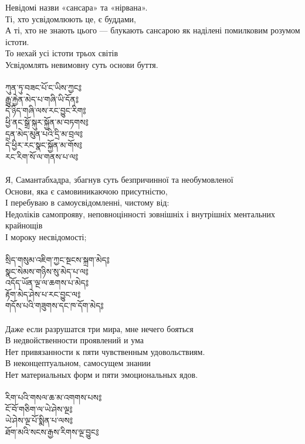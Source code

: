 Невідомі назви «сансара» та «нірвана». \\
Ті, хто усвідомлюють це, є буддами, \\
А ті, хто не знають цього --- блукають сансарою як наділені помилковим розумом істоти. \\
То нехай усі істоти трьох світів \\
Усвідомлять невимовну суть основи буття. \\
\\
{\ti
ཀུན་ཏུ་བཟང་པོ་ང་ཡིས་ཀྱང༔ \\
རྒྱུ་རྐྱེན་མེད་པ་གཞི་ཡི་དོན༔ \\
དེ་ཉིད་གཞི་ལས་རང་བྱུང་རིག༔ \\
ཕྱི་ནང་སྒྲོ་སྐུར་སྐྱོན་མ་བཏགས༔ \\
དྲན་མེད་མུན་པའི་དྲི་མ་བྲལ༔ \\
དེ་ཕྱིར་རང་སྣང་སྐྱོན་མ་གོས༔ \\
རང་རིག་སོ་ལ་གནས་པ་ལ༔}\\
\\
Я, Самантабхадра, збагнув суть безпричинної та необумовленої \\
Основи, яка є самовиникаючою присутністю, \\
І перебуваю в самоусвідомленні, чистому від: \\
Недоліків самопрояву, неповноцінності зовнішніх і внутрішніх ментальних крайнощів \\
І мороку несвідомості; \\
\\
\newpage
{\ti
སྲིད་གསུམ་འཇིག་ཀྱང་སྔངས་སྐྲག་མེད༔\\
སྣང་སེམས་གཉིས་སུ་མེད་པ་ལ༔\\
འདོད་ཡོན་ལྔ་ལ་ཆགས་པ་མེད༔\\
རྟོག་མེད་ཤེས་པ་རང་བྱུང་ལ༔\\
གདོས་པའི་གཟུགས་དང་ཁ་དོག་མེད༔}\\
\\
Даже если разрушатся три мира, мне нечего бояться \\
В недвойственности проявлений и ума \\
Нет привязанности к пяти чувственным удовольствиям. \\
В неконцептуальном, самосущем знании \\
Нет материальных форм и пяти эмоциональных ядов.\\
\\
{\ti
རིག་པའི་གསལ་ཆ་མ་འགགས་པས༔ \\
ངོ་བོ་གཅིག་ལ་ཡེ་ཤེས་ལྔ༔ \\
ཡེ་ཤེས་ལྔ་པོ་སྨིན་པ་ལས༔ \\
ཐོག་མའི་སངས་རྒྱས་རིགས་ལྔ་བྱུང༔}\\
